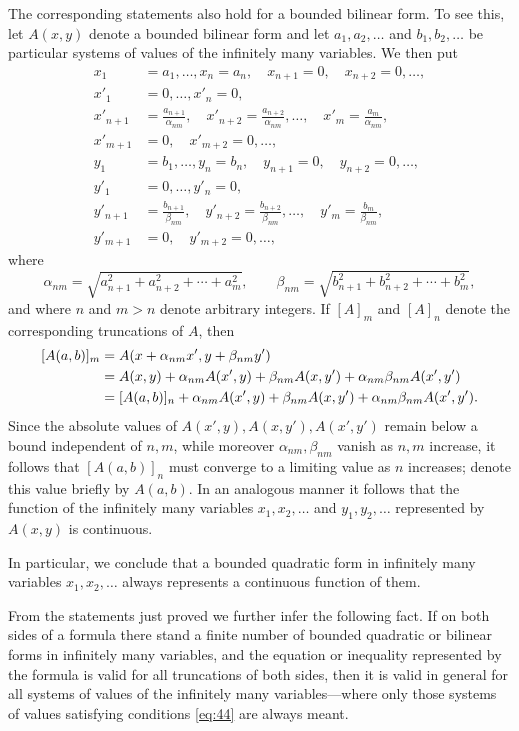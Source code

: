 \documentclass[b5paper,twoside]{article}
\newcommand{\originalpage}[1]{\phantomsection\label{origpage:#1}}
\begin{document}
The corresponding statements also hold for a bounded bilinear form.  To see
this, let $A(x,y)$ denote a bounded bilinear form and let
$a_1,a_2,\ldots$ and $b_1,b_2,\ldots$ be particular systems of values of the
infinitely many variables.  We then put
\begin{align*}
  x_1&=a_1,\ldots,x_n=a_n,
    \quad x_{n+1}=0,\quad x_{n+2}=0,\ldots,\\
  x'_1&=0,\ldots,x'_n=0,\\
  x'_{n+1}&=\frac{a_{n+1}}{\alpha_{nm}},
    \quad x'_{n+2}=\frac{a_{n+2}}{\alpha_{nm}},\ldots,
    \quad x'_m=\frac{a_m}{\alpha_{nm}},\\
  x'_{m+1}&=0,\quad x'_{m+2}=0,\ldots,\\
  y_1&=b_1,\ldots,y_n=b_n,
    \quad y_{n+1}=0,\quad y_{n+2}=0,\ldots,\\
  y'_1&=0,\ldots,y'_n=0,\\
  y'_{n+1}&=\frac{b_{n+1}}{\beta_{nm}},
    \quad y'_{n+2}=\frac{b_{n+2}}{\beta_{nm}},\ldots,
    \quad y'_m=\frac{b_m}{\beta_{nm}},\\
  y'_{m+1}&=0,\quad y'_{m+2}=0,\ldots,
\end{align*}
where
\[
  \alpha_{nm}=\sqrt{a_{n+1}^2+a_{n+2}^2+\cdots+a_m^2},
  \qquad
  \beta_{nm}=\sqrt{b_{n+1}^2+b_{n+2}^2+\cdots+b_m^2},
\]
and where $n$ and $m>n$ denote arbitrary integers.  If $[A]_m$ and $[A]_n$
denote the corresponding truncations of $A$, then
\originalpage{178}
\[
\begin{aligned}
  \relax[A(a,b)]_m
    &=A(x+\alpha_{nm}x',y+\beta_{nm}y')\\
    &=A(x,y)+\alpha_{nm}A(x',y)+\beta_{nm}A(x,y')
      +\alpha_{nm}\beta_{nm}A(x',y')\\
    &=[A(a,b)]_n+\alpha_{nm}A(x',y)+\beta_{nm}A(x,y')
      +\alpha_{nm}\beta_{nm}A(x',y').
\end{aligned}
\]
Since the absolute values of $A(x',y),A(x,y'),A(x',y')$ remain below a bound
independent of $n,m$, while moreover $\alpha_{nm},\beta_{nm}$ vanish as
$n,m$ increase, it follows that $[A(a,b)]_n$ must converge to a limiting
value as $n$ increases; denote this value briefly by $A(a,b)$.  In an
analogous manner it follows that the function of the infinitely many
variables $x_1,x_2,\ldots$ and $y_1,y_2,\ldots$ represented by $A(x,y)$ is
continuous.

In particular, we conclude that a bounded quadratic form in infinitely many
variables $x_1,x_2,\ldots$ always represents a continuous function of them.

From the statements just proved we further infer the following fact.  If on
both sides of a formula there stand a finite number of bounded quadratic or
bilinear forms in infinitely many variables, and the equation or inequality
represented by the formula is valid for all truncations of both sides, then
it is valid in general for all systems of values of the infinitely many
variables---where only those systems of values satisfying conditions
\eqref{eq:44} are always meant.
\end{document}
